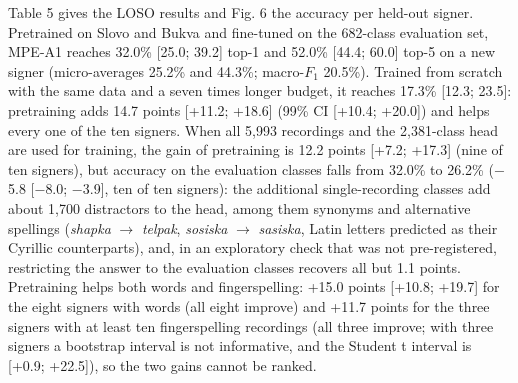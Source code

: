\documentclass[a4paper,fleqn]{cas-dc}
\begin{document}
Table 5 gives the LOSO results and Fig. 6 the accuracy per held-out signer. Pretrained on Slovo and Bukva and fine-tuned on the 682-class evaluation set, MPE-A1 reaches 32.0\% {[}25.0; 39.2{]} top-1 and 52.0\% {[}44.4; 60.0{]} top-5 on a new signer (micro-averages 25.2\% and 44.3\%; macro-\(F_1\) 20.5\%). Trained from scratch with the same data and a seven times longer budget, it reaches 17.3\% {[}12.3; 23.5{]}: pretraining adds 14.7 points {[}+11.2; +18.6{]} (99\% CI {[}+10.4; +20.0{]}) and helps every one of the ten signers. When all 5,993 recordings and the 2,381-class head are used for training, the gain of pretraining is 12.2 points {[}+7.2; +17.3{]} (nine of ten signers), but accuracy on the evaluation classes falls from 32.0\% to 26.2\% ($-$5.8 {[}$-$8.0; $-$3.9{]}, ten of ten signers): the additional single-recording classes add about 1,700 distractors to the head, among them synonyms and alternative spellings (\emph{shapka} $\rightarrow$ \emph{telpak}, \emph{sosiska} $\rightarrow$ \emph{sasiska}, Latin letters predicted as their Cyrillic counterparts), and, in an exploratory check that was not pre-registered, restricting the answer to the evaluation classes recovers all but 1.1 points. Pretraining helps both words and fingerspelling: +15.0 points {[}+10.8; +19.7{]} for the eight signers with words (all eight improve) and +11.7 points for the three signers with at least ten fingerspelling recordings (all three improve; with three signers a bootstrap interval is not informative, and the Student t interval is {[}+0.9; +22.5{]}), so the two gains cannot be ranked.
\end{document}
